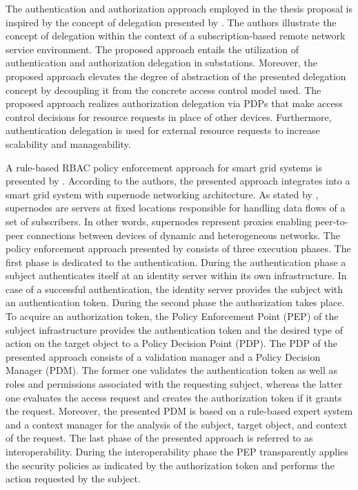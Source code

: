 The authentication and authorization approach employed in the thesis proposal is inspired by the concept of delegation presented by \citeauthor{Ma2006}.
The authors illustrate the concept of delegation within the context of a subscription-based remote network service environment.
The proposed approach entails the utilization of authentication and authorization delegation in substations.
Moreover, the proposed approach elevates the degree of abstraction of the presented delegation concept by decoupling it from the concrete access control model used.
The proposed approach realizes authorization delegation via PDPs that make access control decisions for resource requests in place of other devices.
Furthermore, authentication delegation is used for external resource requests to increase scalability and manageability.

A rule-based RBAC policy enforcement approach for smart grid systems is presented by \citeauthor{Alcaraz2016} \cite{Alcaraz2016}.
According to the authors, the presented approach integrates into a smart grid system with supernode networking architecture.
As stated by \citeauthor{Samuel2008} \cite{Samuel2008}, supernodes are servers at fixed locations responsible for handling data flows of a set of subscribers.
In other words, supernodes represent proxies enabling peer-to-peer connections between devices of dynamic and heterogeneous networks.
The policy enforcement approach presented by \citeauthor{Alcaraz2016} consists of three execution phases.
The first phase is dedicated to the authentication.
During the authentication phase a subject authenticates itself at an identity server within its own infrastructure.
In case of a successful authentication, the identity server provides the subject with an authentication token.
During the second phase the authorization takes place.
To acquire an authorization token, the Policy Enforcement Point (PEP) of the subject infrastructure provides the authentication token and the desired type of action on the target object to a Policy Decision Point (PDP).
The PDP of the presented approach consists of a validation manager and a Policy Decision Manager (PDM).
The former one validates the authentication token as well as roles and permissions associated with the requesting subject, whereas the latter one evaluates the access request and creates the authorization token if it grants the request.
Moreover, the presented PDM is based on a rule-based expert system and a context manager for the analysis of the subject, target object, and context of the request.   
The last phase of the presented approach is referred to as interoperability.
During the interoperability phase the PEP transparently applies the security policies as indicated by the authorization token and performs the action requested by the subject.

